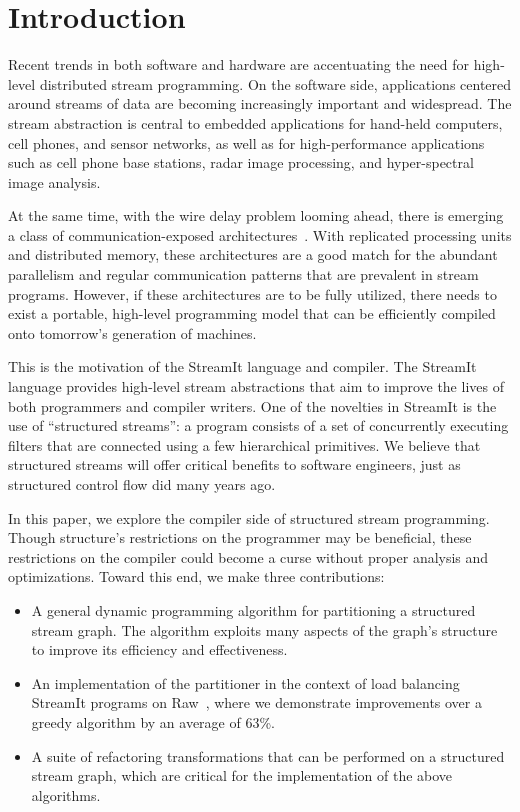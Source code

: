 \section{Introduction}

Recent trends in both software and hardware are accentuating the need for
high-level distributed stream programming.  On the software side,
applications centered around streams of data are becoming increasingly
important and widespread.  The stream abstraction is central to
embedded applications for hand-held computers, cell phones, and sensor
networks, as well as for high-performance applications such as cell
phone base stations, radar image processing, and hyper-spectral image
analysis.  

At the same time, with the wire delay problem looming ahead, there is
emerging a class of communication-exposed
architectures~\cite{raw-micro,trips,smartmemories}.  With replicated
processing units and distributed memory, these architectures are a
good match for the abundant parallelism and regular communication
patterns that are prevalent in stream programs.  However, if these
architectures are to be fully utilized, there needs to exist a
portable, high-level programming model that can be efficiently
compiled onto tomorrow's generation of machines.

This is the motivation of the StreamIt language and compiler.  The
StreamIt language provides high-level stream abstractions that aim to
improve the lives of both programmers and compiler writers.  One of
the novelties in StreamIt is the use of ``structured streams'': a
program consists of a set of concurrently executing filters that are
connected using a few hierarchical primitives.  We believe that
structured streams will offer critical benefits to software engineers,
just as structured control flow did many years ago.

In this paper, we explore the compiler side of structured stream
programming.  Though structure's restrictions on the programmer may be
beneficial, these restrictions on the compiler could become a curse
without proper analysis and optimizations.  Toward this end, we make
three contributions:
\begin{itemize}

\item A general dynamic programming algorithm for partitioning a
structured stream graph.  The algorithm exploits many aspects of the
graph's structure to improve its efficiency and effectiveness.

\item An implementation of the partitioner in the context of load
balancing StreamIt programs on Raw~\cite{raw-micro}, where we
demonstrate improvements over a greedy algorithm by an average of
63\%.

\item A suite of refactoring transformations that can be performed on
a structured stream graph, which are critical for the implementation
of the above algorithms.
\end{itemize}

